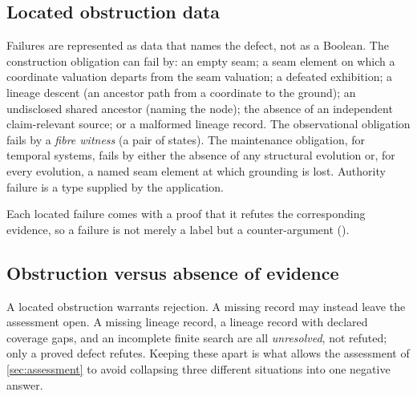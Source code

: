 \subsection{Located obstruction data}
Failures are represented as data that names the defect, not as a Boolean. The construction obligation can fail by: an empty seam; a seam element on which a coordinate valuation departs from the seam valuation; a defeated exhibition; a lineage descent (an ancestor path from a coordinate to the ground); an undisclosed shared ancestor (naming the node); the absence of an independent claim-relevant source; or a malformed lineage record. The observational obligation fails by a \emph{fibre witness} (a pair of states). The maintenance obligation, for temporal systems, fails by either the absence of any structural evolution or, for every evolution, a named seam element at which grounding is lost. Authority failure is a type supplied by the application.

Each located failure comes with a proof that it refutes the corresponding evidence, so a failure is not merely a label but a counter-argument ().

\subsection{Obstruction versus absence of evidence}
A located obstruction warrants rejection. A missing record may instead leave the assessment open. A missing lineage record, a lineage record with declared coverage gaps, and an incomplete finite search are all \emph{unresolved}, not refuted; only a proved defect refutes. Keeping these apart is what allows the assessment of \cref{sec:assessment} to avoid collapsing three different situations into one negative answer.
